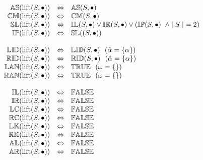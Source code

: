 \[
\begin{array}{rcl} 
{\mathbb{AS}}(\mathrm{lift}(S, \bullet)) 
   & \Leftrightarrow 
   & {\mathbb{AS}}(S, \bullet) \\ 
{\mathbb{CM}}(\mathrm{lift}(S, \bullet)) 
   & \Leftrightarrow 
   & {\mathbb{CM}}(S, \bullet) \\ 
{\mathbb{SL}}(\mathrm{lift}(S, \bullet)) 
   & \Leftrightarrow 
   & {\mathbb{IL}}(S, \bullet) 
     \vee {\mathbb{IR}}(S, \bullet) 
     \vee ({\mathbb{IP}}(S, \bullet)\ \wedge {\mid S \mid} = 2) \\ 
{\mathbb{IP}}(\mathrm{lift}(S, \bullet)) 
   & \Leftrightarrow 
   & {\mathbb{SL}}((S, \bullet)) \\ \\
   
{\mathbb{LID}}(\mathrm{lift}(S, \bullet)) 
   & \Leftrightarrow 
   & {\mathbb{LID}}(S, \bullet)  \ \ (\hat{\alpha} = \{\alpha\})\\ 
{\mathbb{RID}}(\mathrm{lift}(S, \bullet)) 
   & \Leftrightarrow 
   & {\mathbb{RID}}(S, \bullet)  \ \ (\hat{\alpha} = \{\alpha\})\\ 
{\mathbb{LAN}}(\mathrm{lift}(S, \bullet)) 
   & \Leftrightarrow 
   & {\mathbb{TRUE}} \ \ (\omega = \{\})\\ 
{\mathbb{RAN}}(\mathrm{lift}(S, \bullet)) 
   & \Leftrightarrow 
   & {\mathbb{TRUE}} \ \ (\omega = \{\})\\\\
   
{\mathbb{IL}}(\mathrm{lift}(S, \bullet)) 
   & \Leftrightarrow 
   & {\mathbb{FALSE}} \\ 
{\mathbb{IR}}(\mathrm{lift}(S, \bullet)) 
   & \Leftrightarrow 
   & {\mathbb{FALSE}} \\ 
{\mathbb{LC}}(\mathrm{lift}(S, \bullet)) 
   & \Leftrightarrow 
   & {\mathbb{FALSE}} \\ 
{\mathbb{RC}}(\mathrm{lift}(S, \bullet)) 
   & \Leftrightarrow 
   & {\mathbb{FALSE}} \\ 
{\mathbb{LK}}(\mathrm{lift}(S, \bullet)) 
   & \Leftrightarrow 
   & {\mathbb{FALSE}} \\ 
{\mathbb{RK}}(\mathrm{lift}(S, \bullet)) 
   & \Leftrightarrow 
   & {\mathbb{FALSE}} \\  
{\mathbb{AL}}(\mathrm{lift}(S, \bullet))  
   & \Leftrightarrow 
   & {\mathbb{FALSE}} \\
{\mathbb{AR}}(\mathrm{lift}(S, \bullet))  
   & \Leftrightarrow 
   & {\mathbb{FALSE}} \\ 
\end{array} 
\]
